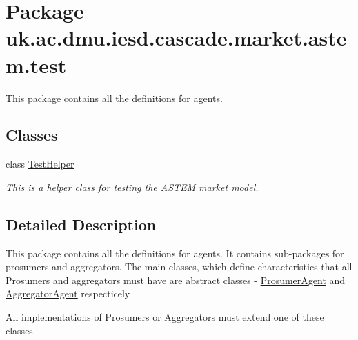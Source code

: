 \hypertarget{namespaceuk_1_1ac_1_1dmu_1_1iesd_1_1cascade_1_1market_1_1astem_1_1test}{\section{Package uk.\-ac.\-dmu.\-iesd.\-cascade.\-market.\-astem.\-test}
\label{namespaceuk_1_1ac_1_1dmu_1_1iesd_1_1cascade_1_1market_1_1astem_1_1test}
}


This package contains all the definitions for agents.  


\subsection*{Classes}
\begin{DoxyCompactItemize}
\item 
class \hyperlink{classuk_1_1ac_1_1dmu_1_1iesd_1_1cascade_1_1market_1_1astem_1_1test_1_1_test_helper}{Test\-Helper}
\begin{DoxyCompactList}\small\item\em This is a helper class for testing the A\-S\-T\-E\-M market model. \end{DoxyCompactList}\end{DoxyCompactItemize}


\subsection{Detailed Description}
This package contains all the definitions for agents. It contains sub-\/packages for prosumers and aggregators. The main classes, which define characteristics that all Prosumers and aggregators must have are abstract classes -\/ \hyperlink{}{Prosumer\-Agent} and \hyperlink{}{Aggregator\-Agent} respecticely

All implementations of Prosumers or Aggregators must extend one of these classes 